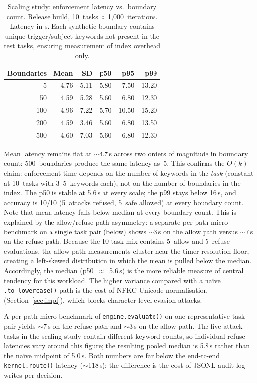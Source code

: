 \documentclass[11pt,a4paper]{article}
\begin{document}
\begin{table}[ht]
\centering
\caption{Scaling study: enforcement latency vs.\ boundary count.
  Release build, 10~tasks $\times$ 1{,}000~iterations.
  Latency in \textmu s. Each synthetic boundary contains unique
  trigger/subject keywords not present in the test tasks, ensuring
  measurement of index overhead only.}
\label{tab:scaling}
\begin{tabular}{rrrrrr}
\toprule
\textbf{Boundaries} & \textbf{Mean} & \textbf{SD} & \textbf{p50} & \textbf{p95} & \textbf{p99} \\
\midrule
  5   & 4.76 & 5.11 & 5.80 &  7.50 & 13.20 \\
 50   & 4.59 & 5.28 & 5.60 &  6.80 & 12.30 \\
100   & 4.96 & 7.22 & 5.70 & 10.50 & 15.20 \\
200   & 4.59 & 3.46 & 5.60 &  6.80 & 13.50 \\
500   & 4.60 & 7.03 & 5.60 &  6.80 & 12.30 \\
\bottomrule
\end{tabular}
\end{table}

Mean latency remains flat at $\sim$4.7\,\textmu s across two orders of
magnitude in boundary count: 500~boundaries produce the same latency as~5.
This confirms the $O(k)$ claim: enforcement time depends on the number of
keywords in the \emph{task} (constant at 10~tasks with 3--5~keywords each),
not on the number of boundaries in the index. The p50 is stable at
5.6\,\textmu s at every scale; the p99 stays below
16\,\textmu s, and accuracy is 10/10 (5~attacks refused,
5~safe allowed) at every boundary count.  Note that mean latency falls
below median at every boundary count.  This is explained by the
allow/refuse path asymmetry: a separate per-path micro-benchmark
on a single task pair (below) shows $\sim$3\,\textmu s on the allow path
versus $\sim$7\,\textmu s on the refuse path.  Because the 10-task mix contains 5~allow and
5~refuse evaluations, the allow-path measurements cluster near the
timer resolution floor, creating a left-skewed distribution in which
the mean is pulled below the median.  Accordingly, the
median (p50~$\approx$~5.6\,\textmu s) is the more reliable measure of
central tendency for this workload.
The higher variance compared
with a na\"ive \texttt{.to\_lowercase()} path is the cost of NFKC
Unicode normalisation (Section~\ref{sec:impl}), which
blocks character-level evasion attacks.

A per-path micro-benchmark of \texttt{engine.evaluate()} on one
representative task pair yields $\sim$7\,\textmu s on the refuse path
and $\sim$3\,\textmu s on the allow path.
The five attack tasks in the scaling study contain different keyword
counts, so individual refuse latencies vary around this figure;
the resulting pooled median is 5.8\,\textmu s rather than the
na\"ive midpoint of 5.0\,\textmu s.  Both numbers are far below the end-to-end
\texttt{kernel.route()} latency ($\sim$118\,\textmu s); the difference
is the cost of JSONL audit-log writes per decision.
\end{document}
